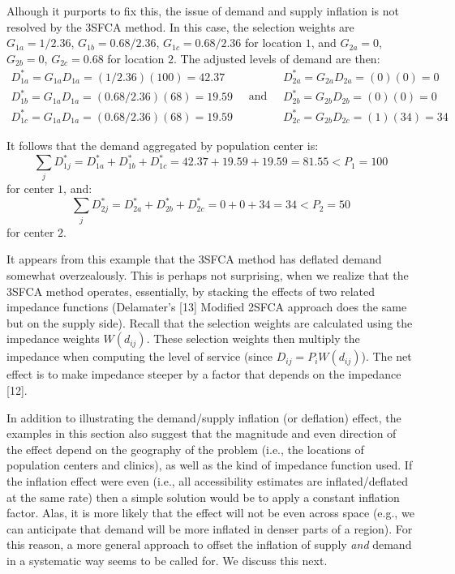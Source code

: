 \documentclass[10pt,letterpaper]{article}
\begin{document}
Alhough it purports to fix this, the issue of demand and supply
inflation is not resolved by the 3SFCA method. In this case, the
selection weights are \(G_{1a} = 1/2.36\), \(G_{1b} = 0.68/2.36\),
\(G_{1c} = 0.68/2.36\) for location \(1\), and \(G_{2a} = 0\),
\(G_{2b} = 0\), \(G_{2c} = 0.68\) for location \(2\). The adjusted
levels of demand are then: \[
\begin{array}{l}
            D^*_{1a} = G_{1a}D_{1a} = (1/2.36)(100) = 42.37 \\
            D^*_{1b} = G_{1a}D_{1a} = (0.68/2.36)(68) = 19.59 \\
            D^*_{1c} = G_{1a}D_{1a} = (0.68/2.36)(68) = 19.59
\end{array}\quad \text{and}\quad
\begin{array}{ll}
            D^*_{2a} = G_{2a}D_{2a} = (0)(0) = 0 \\
            D^*_{2b} = G_{2b}D_{2b} = (0)(0) = 0 \\
            D^*_{2c} = G_{2b}D_{2c} = (1)(34) = 34
\end{array}
\]

It follows that the demand aggregated by population center is: \[
\sum_jD^*_{1j} = D^*_{1a} + D^*_{1b} + D^*_{1c} = 42.37 + 19.59 + 19.59 = 81.55 < P_1 = 100
\] for center \(1\), and: \[
\sum_jD^*_{2j} = D^*_{2a} + D^*_{2b} + D^*_{2c} = 0 + 0 + 34 = 34 < P_2 = 50
\] for center \(2\).

It appears from this example that the 3SFCA method has deflated demand
somewhat overzealously. This is perhaps not surprising, when we realize
that the 3SFCA method operates, essentially, by stacking the effects of
two related impedance functions (Delamater's {[}13{]} Modified 2SFCA
approach does the same but on the supply side). Recall that the
selection weights are calculated using the impedance weights
\(W(d_{ij})\). These selection weights then multiply the impedance when
computing the level of service (since \(D_{ij} = P_iW(d_{ij})\)). The
net effect is to make impedance steeper by a factor that depends on the
impedance {[}12{]}.

In addition to illustrating the demand/supply inflation (or deflation)
effect, the examples in this section also suggest that the magnitude and
even direction of the effect depend on the geography of the problem
(i.e., the locations of population centers and clinics), as well as the
kind of impedance function used. If the inflation effect were even
(i.e., all accessibility estimates are inflated/deflated at the same
rate) then a simple solution would be to apply a constant inflation
factor. Alas, it is more likely that the effect will not be even across
space (e.g., we can anticipate that demand will be more inflated in
denser parts of a region). For this reason, a more general approach to
offset the inflation of supply \emph{and} demand in a systematic way
seems to be called for. We discuss this next.
\end{document}
